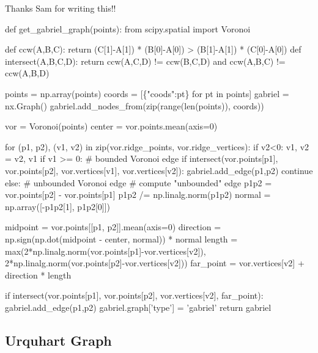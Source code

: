 Thanks Sam for writing this!!

\nwenddocs{}\plusendmoddef\nwstartdeflinemarkup{}\nwenddeflinemarkup
def get_gabriel_graph(points):
    from scipy.spatial import Voronoi
    
    def ccw(A,B,C):
        return (C[1]-A[1]) * (B[0]-A[0]) > (B[1]-A[1]) * (C[0]-A[0])
    def intersect(A,B,C,D):
        return ccw(A,C,D) != ccw(B,C,D) and ccw(A,B,C) != ccw(A,B,D)
    
    points = np.array(points)
    coords = [\{"coods":pt\} for pt in points]
    gabriel = nx.Graph()
    gabriel.add_nodes_from(zip(range(len(points)), coords))

    vor = Voronoi(points)
    center = vor.points.mean(axis=0)
    
    for (p1, p2), (v1, v2) in zip(vor.ridge_points, vor.ridge_vertices):
        if v2<0:
            v1, v2 = v2, v1
        if v1 >= 0: # bounded Voronoi edge
            if intersect(vor.points[p1], vor.points[p2],
                         vor.vertices[v1], vor.vertices[v2]):
                gabriel.add_edge(p1,p2)
            continue
        else: # unbounded Voronoi edge
            # compute "unbounded" edge
            p1p2 = vor.points[p2] - vor.points[p1]
            p1p2 /= np.linalg.norm(p1p2)
            normal = np.array([-p1p2[1], p1p2[0]])

            midpoint = vor.points[[p1, p2]].mean(axis=0)
            direction = np.sign(np.dot(midpoint - center, normal)) * normal
            length = max(2*np.linalg.norm(vor.points[p1]-vor.vertices[v2]),
                         2*np.linalg.norm(vor.points[p2]-vor.vertices[v2]))
            far_point = vor.vertices[v2] + direction * length
            
            if intersect(vor.points[p1], vor.points[p2],
                         vor.vertices[v2], far_point):
                gabriel.add_edge(p1,p2)
    gabriel.graph['type'] = 'gabriel'
    return gabriel
\nwendcode{}\nwdocspar


\subsection{Urquhart Graph}

